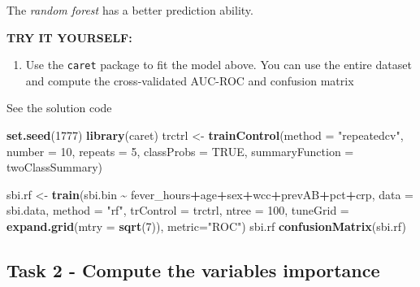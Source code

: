 \documentclass[
]{book}
\newenvironment{Shaded}{\begin{snugshade}}{\end{snugshade}}
\newcommand{\AttributeTok}[1]{\textcolor[rgb]{0.13,0.29,0.53}{#1}}
\newcommand{\ConstantTok}[1]{\textcolor[rgb]{0.56,0.35,0.01}{#1}}
\newcommand{\DecValTok}[1]{\textcolor[rgb]{0.00,0.00,0.81}{#1}}
\newcommand{\FunctionTok}[1]{\textcolor[rgb]{0.13,0.29,0.53}{\textbf{#1}}}
\newcommand{\NormalTok}[1]{#1}
\newcommand{\OtherTok}[1]{\textcolor[rgb]{0.56,0.35,0.01}{#1}}
\newcommand{\SpecialCharTok}[1]{\textcolor[rgb]{0.81,0.36,0.00}{\textbf{#1}}}
\newcommand{\StringTok}[1]{\textcolor[rgb]{0.31,0.60,0.02}{#1}}
\providecommand{\tightlist}{%
  \setlength{\itemsep}{0pt}\setlength{\parskip}{0pt}}
\begin{document}
The \emph{random forest} has a better prediction ability.

\textbf{TRY IT YOURSELF:}

\begin{enumerate}
\def\labelenumi{\arabic{enumi})}
\tightlist
\item
  Use the \texttt{caret} package to fit the model above. You can use
  the entire dataset and compute the cross-validated AUC-ROC and confusion matrix
\end{enumerate}

See the solution code

\begin{Shaded}
\begin{Highlighting}[]
\FunctionTok{set.seed}\NormalTok{(}\DecValTok{1777}\NormalTok{)}
\FunctionTok{library}\NormalTok{(caret)}
\NormalTok{trctrl      }\OtherTok{\textless{}{-}} \FunctionTok{trainControl}\NormalTok{(}\AttributeTok{method =} \StringTok{"repeatedcv"}\NormalTok{, }
                            \AttributeTok{number =} \DecValTok{10}\NormalTok{,}
                            \AttributeTok{repeats =} \DecValTok{5}\NormalTok{,}
                             \AttributeTok{classProbs =} \ConstantTok{TRUE}\NormalTok{,  }
                            \AttributeTok{summaryFunction =}\NormalTok{ twoClassSummary)}

\NormalTok{sbi.rf    }\OtherTok{\textless{}{-}} \FunctionTok{train}\NormalTok{(sbi.bin }\SpecialCharTok{\textasciitilde{}}\NormalTok{ fever\_hours}\SpecialCharTok{+}\NormalTok{age}\SpecialCharTok{+}\NormalTok{sex}\SpecialCharTok{+}\NormalTok{wcc}\SpecialCharTok{+}\NormalTok{prevAB}\SpecialCharTok{+}\NormalTok{pct}\SpecialCharTok{+}\NormalTok{crp,}
                            \AttributeTok{data =}\NormalTok{ sbi.data,}
                            \AttributeTok{method =} \StringTok{"rf"}\NormalTok{,}
                            \AttributeTok{trControl =}\NormalTok{ trctrl,}
                            \AttributeTok{ntree =} \DecValTok{100}\NormalTok{,}
                            \AttributeTok{tuneGrid =} \FunctionTok{expand.grid}\NormalTok{(}\AttributeTok{mtry =} \FunctionTok{sqrt}\NormalTok{(}\DecValTok{7}\NormalTok{)),}
                            \AttributeTok{metric=}\StringTok{"ROC"}\NormalTok{)}
\NormalTok{sbi.rf}
\FunctionTok{confusionMatrix}\NormalTok{(sbi.rf)}
\end{Highlighting}
\end{Shaded}

\subsection*{Task 2 - Compute the variables importance}\label{task-2---compute-the-variables-importance}
\end{document}
